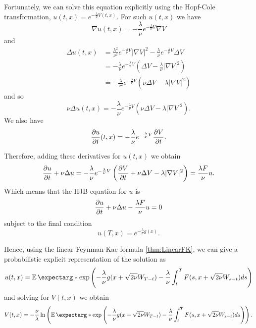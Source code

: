 Fortunately, we can solve this equation explicitly using the Hopf-Cole transformation, $u(t,x)= e^{-\frac{\lambda}{\nu} V(t,x)}$. For such $u(t,x)$ we have
\begin{equation}
	\nabla u(t,x)=-\frac{\lambda}{\nu} e^{-\frac{\lambda}{\nu} V}\nabla V
\end{equation}
and
\begin{equation}
	\begin{split}
		\Delta u(t,x)&=\frac{\lambda^2}{\nu^2} e^{-\frac{\lambda}{\nu} V}|\nabla V|^2-\frac{\lambda}{\nu} e^{-\frac{\lambda}{\nu} V}\Delta V \\
		&=-\frac{\lambda}{\nu} e^{-\frac{\lambda}{\nu} V}\left(\Delta V - \frac{\lambda}{\nu} |\nabla V|^2 \right)\\
		&=-\frac{\lambda}{\nu^2} e^{-\frac{\lambda}{\nu} V}\left(\nu\Delta V - \lambda |\nabla V|^2 \right)
	\end{split}
\end{equation}
and so
\begin{equation}
	\nu \Delta u(t,x)=-\frac{\lambda}{\nu} e^{-\frac{\lambda}{\nu} V}\left(\nu\Delta V - \lambda |\nabla V|^2 \right).
\end{equation}
We also have
\begin{equation}
	\frac{\partial u}{\partial t}(t,x)=-\frac{\lambda}{\nu} e^{-\frac{\lambda}{\nu} V} \frac{\partial V}{\partial t}.
\end{equation}

Therefore, adding these derivatives for $u(t,x)$ we obtain 
\begin{equation}
	\frac{\partial u}{\partial t}+\nu\Delta u=-\frac{\lambda}{\nu}e^{-\frac{\lambda}{\nu} V}\left(\frac{\partial V}{\partial t}+\nu \Delta V -\lambda |\nabla V|^2\right)=\frac{\lambda F}{\nu}u.
\end{equation}
Which means that the HJB equation for $u$ is 
\begin{equation}
	\frac{\partial u}{\partial t}+\nu \Delta u-\frac{\lambda F}{\nu}u=0
\end{equation}
subject to the final condition 
\begin{equation}
	u(T,x)=e^{-\frac{\lambda}{\nu} g(x)}.
\end{equation}

Hence, using the linear Feynman-Kac formula \ref{thm:LinearFK}, we can give a probabilistic explicit representation of the solution as
\begin{equation}
	u(t,x)=\expect*{\exp\left(-\frac{\lambda}{\nu} g(x+\sqrt{2\nu}W_{T-t})-\frac{\lambda}{\nu}\int_{t}^{T}F(s,x+\sqrt{2\nu}W_{s-t})ds\right)}
\end{equation}
and solving for $V(t,x)$ we obtain
\begin{equation}
	\label{eqn:probabilisticExact}
	V(t,x)=-\frac{\nu}{\lambda}\ln\left(\expect*{\exp \left(-\frac{\lambda}{\nu} g(x+\sqrt{2\nu}W_{T-t})-\frac{\lambda}{\nu}\int_{t}^{T}F(s,x+\sqrt{2\nu}W_{s-t})ds\right)}\right).
\end{equation}